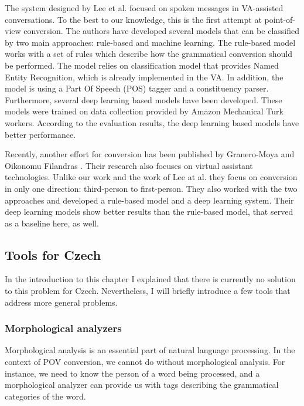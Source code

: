 The system designed by Lee et al. \cite{lee2020converting} focused on spoken messages in VA-assisted conversations. To the best to our knowledge, this is the first attempt at point-of-view conversion. The authors have developed several models that can be classified by two main approaches: rule-based and machine learning. The rule-based model works with a set of rules which describe how the grammatical conversion should be performed. The model relies on classification model that provides Named Entity Recognition, which is already implemented in the VA. In addition, the model is using a Part Of Speech (POS) tagger and a constituency parser. Furthermore, several deep learning based models have been developed. These models were trained on data collection provided by Amazon Mechanical Turk workers. According to the evaluation results, the deep learning based models have better performance.

Recently, another effort for conversion has been published by Granero-Moya and Oikonomu Filandras \cite{granero-moya-oikonomou-filandras-2021-taking}. Their research also focuses on virtual assistant technologies. Unlike our work and the work of Lee at al. they focus on conversion in only one direction: third-person to first-person. They also worked with the two approaches and developed a rule-based model and a deep learning system. Their deep learning models show better results than the rule-based model, that served as a baseline here, as well.

\subsection{Tools for Czech}

In the introduction to this chapter I explained that there is currently no solution to this problem for Czech. Nevertheless, I will briefly introduce a few tools that address more general problems.

\subsubsection{Morphological analyzers}

Morphological analysis is an essential part of natural language processing. In the context of POV conversion, we cannot do without morphological analysis. For instance, we need to know the person of a word being processed, and a morphological analyzer can provide us with tags describing the grammatical categories of the word.

